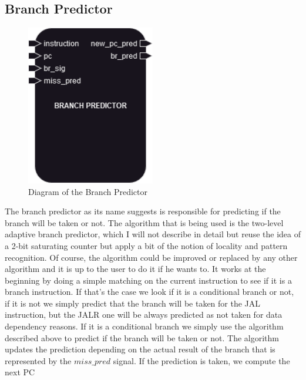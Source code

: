 \subsection{Branch Predictor}

\begin{figure}[H]
\centering
\includegraphics[width=0.5\textwidth]{../diagrams/fetch/br_predictor.png}
\caption{Diagram of the Branch Predictor}
\label{fig:br_predictor}
\end{figure}

The branch predictor as its name suggests is responsible for predicting if the branch will be taken or not. The algorithm that 
is being used is the two-level adaptive branch predictor, which I will not describe in detail but reuse the idea of a 
2-bit saturating counter but apply a bit of the notion of locality and pattern recognition. Of course, the algorithm
could be improved or replaced by any other algorithm and it is up to the user to do it if he wants to.
It works at the beginning by doing a simple matching on the current instruction to see if it is a branch instruction.
If that's the case we look if it is a conditional branch or not, if it is not we simply predict that the branch will be taken for 
the JAL instruction, but the JALR one will be always predicted as not taken for data dependency reasons. If it is a conditional branch
we simply use the algorithm described above to predict if the branch will be taken or not. The algorithm updates the prediction depending 
on the actual result of the branch that is represented by the $miss\_pred$ signal. If the prediction is taken, we compute the next PC \\

